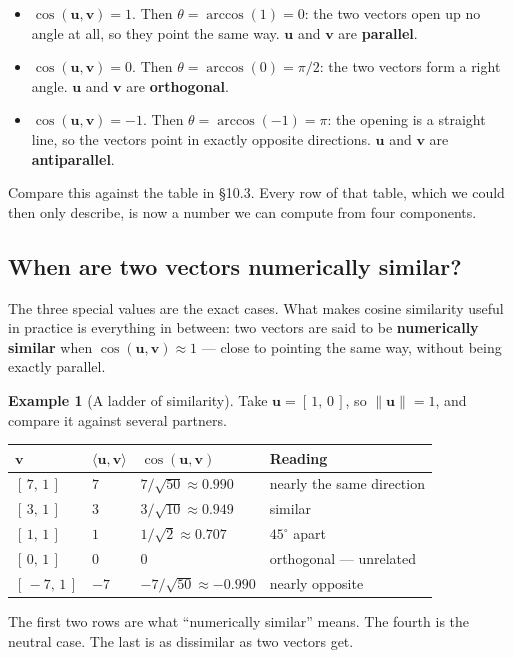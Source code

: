 \documentclass[11pt]{article}
\theoremstyle{definition}
\newtheorem{ex}{Example}[section]
\theoremstyle{remark}
\newcommand{\vc}[1]{\mathbf{#1}}
\newcommand{\norm}[1]{\lVert #1\rVert}
\begin{document}
\begin{itemize}[leftmargin=1.4em,itemsep=4pt]
  \item $\cos(\vc{u},\vc{v})=1$. Then $\theta=\arccos(1)=0$: the two vectors
        open up no angle at all, so they point the same way. $\vc{u}$ and
        $\vc{v}$ are \textbf{parallel}.
  \item $\cos(\vc{u},\vc{v})=0$. Then $\theta=\arccos(0)=\pi/2$: the two vectors
        form a right angle. $\vc{u}$ and $\vc{v}$ are \textbf{orthogonal}.
  \item $\cos(\vc{u},\vc{v})=-1$. Then $\theta=\arccos(-1)=\pi$: the opening is
        a straight line, so the vectors point in exactly opposite directions.
        $\vc{u}$ and $\vc{v}$ are \textbf{antiparallel}.
\end{itemize}

\noindent Compare this against the table in \S10.3. Every row of that table,
which we could then only describe, is now a number we can compute from four
components.

\subsection{When are two vectors numerically similar?}
The three special values are the exact cases. What makes cosine similarity
useful in practice is everything in between: two vectors are said to be
\textbf{numerically similar} when $\cos(\vc{u},\vc{v})\approx 1$ --- close to
pointing the same way, without being exactly parallel.

\begin{ex}[A ladder of similarity]
Take $\vc{u}=[\,1,\,0\,]$, so $\norm{\vc{u}}=1$, and compare it against
several partners.
\begin{center}
\renewcommand{\arraystretch}{1.35}
\begin{tabular}{@{}l l l l@{}}
\toprule
$\vc{v}$ & $\langle\vc{u},\vc{v}\rangle$ & $\cos(\vc{u},\vc{v})$ & \textbf{Reading} \\
\midrule
$[\,7,\,1\,]$   & $7$   & $7/\sqrt{50}\approx 0.990$   & nearly the same direction \\
$[\,3,\,1\,]$   & $3$   & $3/\sqrt{10}\approx 0.949$   & similar \\
$[\,1,\,1\,]$   & $1$   & $1/\sqrt{2}\approx 0.707$    & $45^{\circ}$ apart \\
$[\,0,\,1\,]$   & $0$   & $0$                          & orthogonal --- unrelated \\
$[\,-7,\,1\,]$  & $-7$  & $-7/\sqrt{50}\approx -0.990$ & nearly opposite \\
\bottomrule
\end{tabular}
\end{center}
The first two rows are what ``numerically similar'' means. The fourth is the
neutral case. The last is as dissimilar as two vectors get.
\end{ex}
\end{document}
